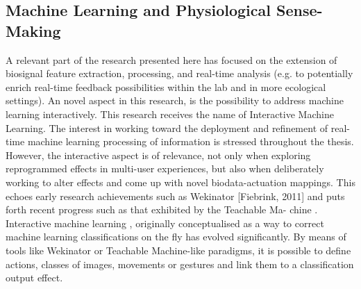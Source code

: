 \subsection{Machine Learning and Physiological Sense-Making}

A relevant part of the research presented here has focused on the extension of biosignal feature extraction, processing, and real-time analysis (e.g. to potentially enrich real-time feedback possibilities within the lab and in more ecological settings).  An novel aspect in this research, is the possibility to address machine learning interactively. This research receives the name of Interactive Machine Learning. The interest in working toward the deployment and refinement of real-time machine learning processing of information is stressed throughout the thesis. However, the interactive aspect is of relevance, not only when exploring reprogrammed effects in multi-user experiences, but also when deliberately working to alter effects and come up with novel biodata-actuation mappings. This echoes early research achievements such as Wekinator \cite{} [Fiebrink, 2011] and puts forth recent progress such as that exhibited by the Teachable Ma- chine \cite{carney_teachable_2020}. Interactive machine learning \cite{fails_interactive_2003}, originally conceptualised as a way to correct machine learning classifications on the fly has evolved significantly. By means of tools like Wekinator or Teachable Machine-like paradigms, it is possible to define actions, classes of images, movements or gestures and link them to a classification output effect.

